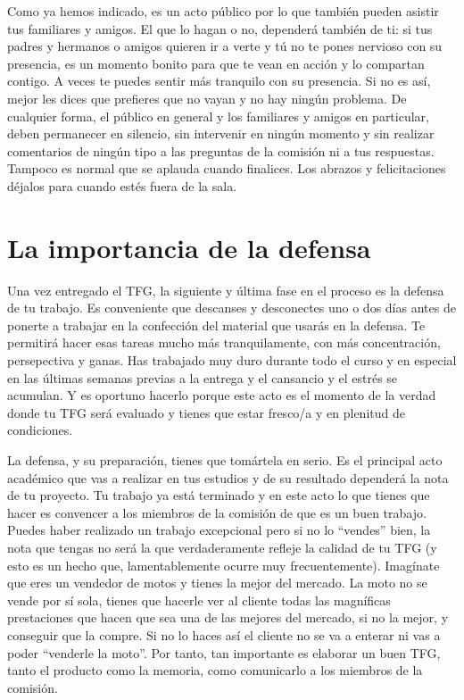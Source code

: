 Como ya hemos indicado, es un acto público por lo que también pueden asistir tus familiares y amigos. El que lo hagan o no, dependerá también de ti: si tus padres y hermanos o amigos quieren ir a verte y tú no te pones nervioso con su presencia, es un momento bonito para que te vean en acción y lo compartan contigo. A veces te puedes sentir más tranquilo con su presencia. Si no es así, mejor les dices que prefieres que no vayan y no hay ningún problema. De cualquier forma, el público en general y los familiares y amigos en particular, deben permanecer en silencio, sin intervenir en ningún momento y sin realizar comentarios de ningún tipo a las preguntas de la comisión ni a tus respuestas. Tampoco es normal que se aplauda cuando finalices. Los abrazos y felicitaciones déjalos para cuando estés fuera de la sala.

\section{La importancia de la defensa}


Una vez entregado el TFG, la siguiente y última fase en el proceso es la defensa de tu trabajo. Es conveniente que descanses y desconectes uno o dos días antes de ponerte a trabajar en la confección del material que usarás en la defensa. Te permitirá hacer esas tareas mucho más tranquilamente, con más concentración, persepectiva y ganas. Has trabajado muy duro durante todo el curso y en especial en las últimas semanas previas a la entrega y el cansancio y el estrés se acumulan. Y es oportuno hacerlo porque este acto es el momento de la verdad donde tu TFG será evaluado y tienes que estar fresco/a y en plenitud de condiciones.

La defensa, y su preparación, tienes que tomártela en serio. Es el principal acto académico que vas a realizar en tus estudios y de su resultado dependerá la nota de tu proyecto. Tu trabajo ya está terminado y en este acto lo que tienes que hacer es convencer a los miembros de la comisión de que es un buen trabajo. Puedes haber realizado un trabajo excepcional pero si no lo ``vendes'' bien, la nota que tengas no será la que verdaderamente refleje la calidad de tu TFG (y esto es un hecho que, lamentablemente ocurre muy frecuentemente). Imagínate que eres un vendedor de motos y tienes la mejor del mercado. La moto no se vende por sí sola, tienes que hacerle ver al cliente todas las magníficas prestaciones que hacen que sea una de las mejores del mercado, si no la mejor, y conseguir que la compre. Si no lo haces así el cliente no se va a enterar ni vas a poder ``venderle la moto''. Por tanto, tan importante es elaborar un buen TFG, tanto el producto como la memoria, como comunicarlo a los miembros de la comisión. 


